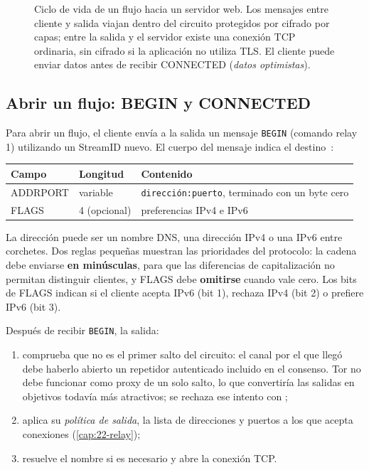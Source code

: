 \begin{figure}[htbp]
\centering

\caption{Ciclo de vida de un flujo hacia un servidor web. Los mensajes entre cliente y salida viajan dentro del circuito protegidos por cifrado por capas; entre la salida y el servidor existe una conexión TCP ordinaria, sin cifrado si la aplicación no utiliza TLS. El cliente puede enviar datos antes de recibir CONNECTED (\emph{datos optimistas}).}
\label{fig:stream}
\end{figure}

\subsection{Abrir un flujo: BEGIN y CONNECTED}

Para abrir un flujo, el cliente envía a la salida un mensaje \texttt{BEGIN} (comando relay 1) utilizando un StreamID nuevo. El cuerpo del mensaje indica el destino~:

\begin{center}
\begin{tabular}{lll}
\toprule
Campo & Longitud & Contenido \\
\midrule
ADDRPORT & variable & \texttt{dirección:puerto}, terminado con un byte cero \\
FLAGS & 4 (opcional) & preferencias IPv4 e IPv6 \\
\bottomrule
\end{tabular}
\end{center}

La dirección puede ser un nombre DNS, una dirección IPv4 o una IPv6 entre corchetes. Dos reglas pequeñas muestran las prioridades del protocolo: la cadena debe enviarse \textbf{en minúsculas}, para que las diferencias de capitalización no permitan distinguir clientes, y FLAGS debe \textbf{omitirse} cuando vale cero. Los bits de FLAGS indican si el cliente acepta IPv6 (bit 1), rechaza IPv4 (bit 2) o prefiere IPv6 (bit 3).

Después de recibir \texttt{BEGIN}, la salida:
\begin{enumerate}
  \item comprueba que no es el primer salto del circuito: el canal por el que llegó debe haberlo abierto un repetidor autenticado incluido en el consenso. Tor no debe funcionar como proxy de un solo salto, lo que convertiría las salidas en objetivos todavía más atractivos; se rechaza ese intento con ;
  \item aplica su \emph{política de salida}, la lista de direcciones y puertos a los que acepta conexiones (\cref{cap:22-relay});
  \item resuelve el nombre si es necesario y abre la conexión TCP.
\end{enumerate}

